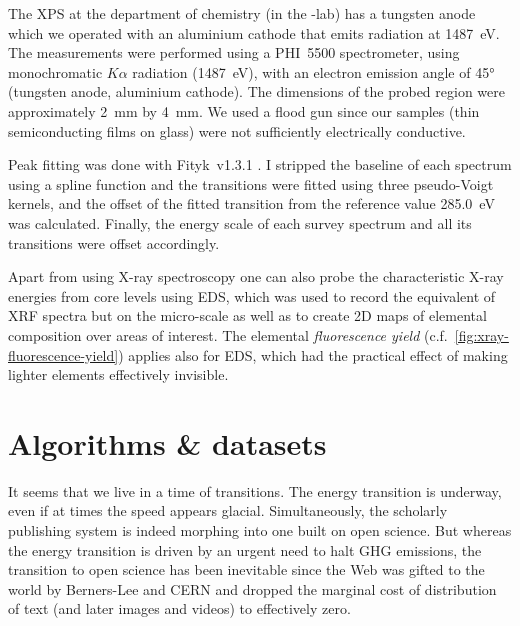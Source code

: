 \documentclass[draft,webedition,openright,titles,swedish,english]{LuaUUThesis}\usepackage[]{graphicx}\usepackage[]{xcolor}
\newcommand{\cf}{c.f.}
\begin{document}
The \gls{XPS} at the department of chemistry (in the -lab) has a
tungsten anode which we operated with an aluminium cathode that emits radiation
at \qty{1487}{\eV}.
The measurements were performed using a PHI~5500 spectrometer, using
monochromatic  $K\alpha$ radiation (\qty{1487}{\eV}), with an electron
emission angle of \ang{45} (tungsten anode, aluminium cathode).
The dimensions of the probed region were approximately \qty{2}{\mm} by \qty{4}{\mm}.
We used a flood gun since our samples (thin semiconducting films on glass) were
not sufficiently electrically conductive.

Peak fitting was done with Fityk~v1.3.1 \cite{Wojdyr2010}.
I stripped the baseline of each  spectrum using a spline function
and the transitions were fitted using three pseudo-Voigt kernels, and
the offset of the fitted  transition from the reference value
\qty{285.0}{\eV} was calculated.
Finally, the energy scale of each survey spectrum and all its transitions
were offset accordingly.

Apart from using X-ray spectroscopy one can also probe the characteristic X-ray energies
from core levels using \gls{EDS}, which was used to record the equivalent of \gls{XRF} spectra
but on the micro-scale
as well as to create 2D maps of elemental composition over areas of interest.
The elemental \emph{fluorescence yield} (\cf\ \cref{fig:xray-fluorescence-yield})
applies also for \gls{EDS}, which had the practical effect of making lighter elements
effectively invisible.





\chapter[Algorithms \& datasets]{Algorithms \& datasets}
\label{ch:algorithms-datasets}


It seems that we live in a time of transitions.
The energy transition is underway, even if at times the speed appears glacial.
Simultaneously, the scholarly publishing system is indeed morphing into
one built on open science.
But whereas the energy transition is driven by an urgent need to halt
\gls{GHG} emissions, the transition to open science has been inevitable \cite{Dyson2000}
since the Web was gifted to the world by Berners-Lee and CERN \cite{Hoffmann2023}
and dropped the marginal cost of distribution of text (and later images and videos)
to effectively zero.
\end{document}
